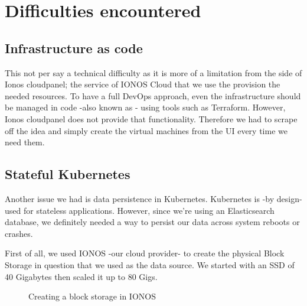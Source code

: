 \section{Difficulties encountered}
\subsection{Infrastructure as code}
This not per say a technical difficulty as it is more of a limitation from the side of Ionos cloudpanel; the service of IONOS Cloud that we use the provision the needed resources.
To have a full DevOps approach, even the infrastructure should be managed in code -also known as - using tools such as Terraform.
However, Ionos cloudpanel does not provide that functionality.
Therefore we had to scrape off the idea and simply create the virtual machines from the UI every time we need them.

\subsection{Stateful Kubernetes}
Another issue we had is data persistence in Kubernetes.
Kubernetes is -by design- used for stateless applications.
However, since we're using an Elasticsearch database, we definitely needed a way to persist our data across system reboots or crashes.

First of all, we used IONOS -our cloud provider- to create the physical Block Storage in question that we used as the data source.
We started with an SSD of 40 Gigabytes then scaled it up to 80 Gigs.

\begin{figure}[H]
    \centering
    \caption{Creating a block storage in IONOS}
    \label{fig:ionos-block-storage}
\end{figure}

